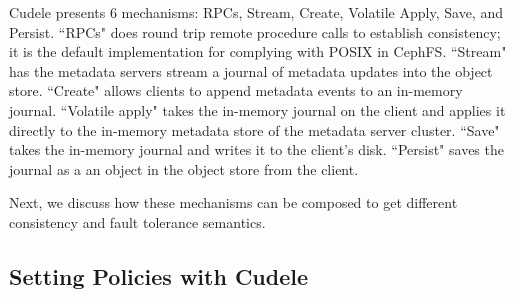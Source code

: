 Cudele presents 6 mechanisms: RPCs, Stream, Create, Volatile Apply, Save, and
Persist. ``RPCs" does round trip remote procedure calls to establish
consistency; it is the default implementation for complying with POSIX in
CephFS. ``Stream" has the metadata servers stream a journal of metadata updates
into the object store. ``Create" allows clients to append metadata events to an
in-memory journal. ``Volatile apply" takes the in-memory journal on the client
and applies it directly to the in-memory metadata store of the metadata server
cluster. ``Save" takes the in-memory journal and writes it to the client's
disk. ``Persist" saves the journal as a an object in the object store from the
client.

Next, we discuss how these mechanisms can be composed to get different
consistency and fault tolerance semantics. 


\subsection{Setting Policies with Cudele}
\label{sec:setting-policies-with-cudele}

